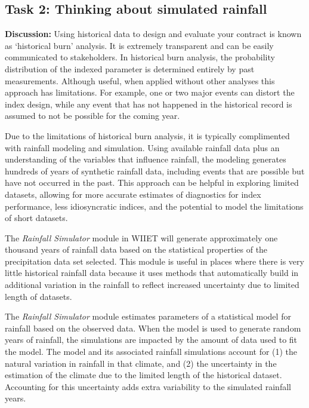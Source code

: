 \documentclass[letterpaper,10pt,english]{sphinxmanual}
\begin{document}
\subsection{Task 2: Thinking about simulated rainfall}
\label{wiiet/wiiet_influenceshortdatasets_Web:task-2-thinking-about-simulated-rainfall}
\textbf{Discussion:} Using historical data to design and evaluate your contract is known as `historical burn' analysis. It is extremely transparent and can be easily communicated to stakeholders. In historical burn analysis, the probability distribution of the indexed parameter is determined entirely by past measurements. Although useful, when applied without other analyses this approach has limitations. For example, one or two major events can distort the index design, while any event that has not happened in the historical record is assumed to not be possible for the coming year.

Due to the limitations of historical burn analysis, it is typically complimented with rainfall modeling and simulation. Using available rainfall data plus an understanding of the variables that influence rainfall, the modeling generates hundreds of years of synthetic rainfall data, including events that are possible but have not occurred in the past. This approach can be helpful in exploring limited datasets, allowing for more accurate estimates of diagnostics for index performance, less idiosyncratic indices, and the potential to model the limitations of short datasets.

The \emph{Rainfall Simulator} module in WIIET will generate approximately one thousand years of rainfall data based on the statistical properties of the precipitation data set selected. This module is useful in places where there is very little historical rainfall data because it uses methods that automatically build in additional variation in the rainfall to reflect increased uncertainty due to limited length of datasets.

The \emph{Rainfall Simulator} module estimates parameters of a statistical model for rainfall based on the observed data. When the model is used to generate random years of rainfall, the simulations are impacted by the amount of data used to fit the model. The model and its associated rainfall simulations account for (1) the natural variation in rainfall in that climate, and (2) the uncertainty in the estimation of the climate due to the limited length of the historical dataset. Accounting for this uncertainty adds extra variability to the simulated rainfall years.
\end{document}
